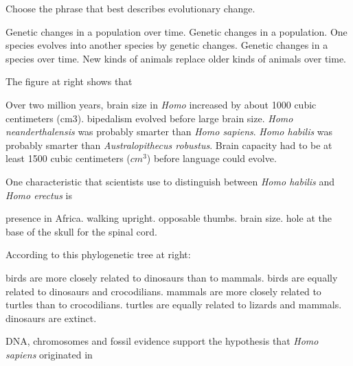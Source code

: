 \question
Choose the phrase that best describes evolutionary change.

\begin{choices}
\correctchoice Genetic changes in a population over time.%
\choice Genetic changes in a population.%
\choice One species evolves into another species by genetic changes.%
\choice Genetic changes in a species over time.%
\choice New kinds of animals replace older kinds of animals over time.%
\end{choices}

\question
The figure at right shows that 

\begin{choices}
\correctchoice Over two million years, brain size in \textit{Homo} increased by about 1000 cubic centimeters (cm3).%
\choice bipedalism evolved before large brain size.%
\choice \textit{Homo neanderthalensis} was probably smarter than \textit{Homo sapiens}.%
\choice \textit{Homo habilis} was probably smarter than \textit{Australopithecus robustus}.%
\choice Brain capacity had to be at least 1500 cubic centimeters ($cm^3$) before language could evolve.%
\end{choices}

\question
One characteristic that scientists use to distinguish between \textit{Homo habilis} and \textit{Homo erectus} is

\begin{choices}
\choice presence in Africa.%
\choice walking upright.%
\choice opposable thumbs.%
\correctchoice brain size.%
\choice hole at the base of the skull for the spinal cord.%
\end{choices}

\question
According to this phylogenetic tree at right:

\begin{choices}
\correctchoice birds are more closely related to dinosaurs than to mammals.%
\choice birds are equally related to dinosaurs and crocodilians.%
\choice mammals are more closely related to turtles than to crocodilians.%
\choice turtles are equally related to lizards and mammals.%
\choice dinosaurs are extinct.%
\end{choices}

\question
DNA, chromosomes and fossil evidence support the hypothesis that \textit{Homo sapiens} originated in


